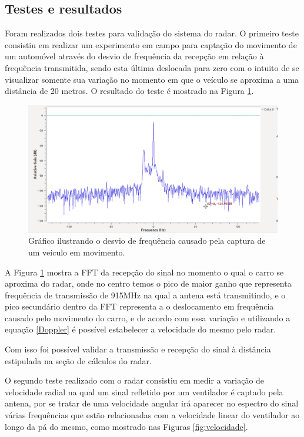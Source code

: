 \subsection{Testes e resultados}

    Foram realizados dois testes para validação do sistema do radar. O primeiro teste consistiu em realizar um experimento em campo para captação do movimento de um automóvel através do desvio de frequência da recepção em relação à frequência transmitida, sendo esta última deslocada para zero com o intuito de se visualizar somente sua variação no momento em que o veículo se aproxima a uma distância de 20 metros. O resultado do teste é mostrado na Figura \ref{TVeiculo}.

\begin{figure}[H]
    \centering
    \includegraphics[scale=0.23]{figuras/Carro.png}
    \caption{Gráfico ilustrando o desvio de frequência causado pela captura de um veículo em movimento.}
    \label{TVeiculo}
\end{figure}

A Figura \ref{TVeiculo} mostra a FFT da recepção do sinal no momento o qual o carro se aproxima do radar, onde no centro temos o pico de maior ganho que representa frequência de transmissão de 915MHz na qual a antena está transmitindo, e o pico secundário dentro da FFT representa a o deslocamento em frequência causado pelo movimento do carro, e de acordo com essa variação e utilizando a equação \ref{Doppler} é possível estabelecer a velocidade do mesmo pelo radar.

Com isso foi possível validar a transmissão e recepção do sinal à distância estipulada na seção de cálculos do radar. 

O segundo teste realizado com o radar consistiu em
medir a variação de velocidade radial na qual um sinal refletido por um ventilador é captado pela antena, por se tratar de uma velocidade angular irá aparecer no espectro do sinal várias frequências que estão relacionadas com a velocidade linear do ventilador ao longo da pá do mesmo, como mostrado nas Figuras \ref{fig:velocidade}.

